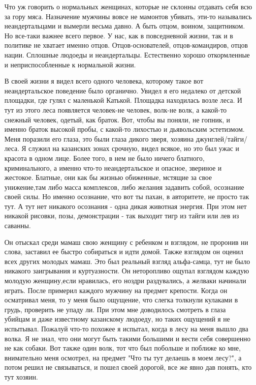 Что уж говорить о нормальных женщинах, которые не склонны отдавать себя всю за
гору мяса. Назначение мужчины вовсе не мамонтов убивать, эти-то назывались
неандертальцами и вымерли весьма давно. А быть отцом, воином, защитником. Но
все-таки важнее всего первое. У нас, как в повседневной жизни, так и в политике
не хватает именно отцов. Отцов-основателей, отцов-командиров, отцов нации.
Сплошные людоеды и неандертальцы. Естественно хорошо откормленные и
неприспособленные к нормальной жизни. 

В своей жизни я видел всего одного человека, которому такое вот неандертальское
поведение было органично. Увидел я его недалеко от детской площадки, где гулял
с маленькой Катькой. Площадка находилась возле леса. И тут из этого леса
появляется человек-не человек, волк-не волк, а какой-то снежный человек,
одетый, как браток. Вот, чтобы вы поняли, не гопник, и именно браток высокой
пробы, с какой-то лихостью и дьявольским эстетизмом. Меня поразили его глаза,
это были глаза дикого зверя, хозяина джунглей/тайги/леса. Я служил на казанских
зонах срочную, видел всякое, но это был ужас и красота в одном лице. Более
того, в нем не было ничего блатного, криминального, а именно что-то
неандертальское и опасное, звериное и жестокое. Блатные, они как бы жизнью
обиженные, мстящие за свое унижение,там либо масса комплексов, либо желания
задавить собой, осознание своей силы. Но именно осознание, что вот ты пахан, в
авторитете, не просто так тут. А тут нет никакого осознания - одна дикая
животная энергия. При этом нет никакой рисовки, позы, демонстрации - так
выходит тигр из тайги или лев из саванны. 

Он отыскал среди мамаш свою женщину с ребенком и взглядом, не проронив ни
слова, заставил ее быстро собираться и идти домой. Также взглядом он оценил
всех других молодых мамаш. Это был реальный взгляд альфа-самца, тут не было
никакого заигрывания и куртуазности. Он неторопливо ощупал взглядом каждую
молодую женщину,если нравилась, его ноздри раздувались, а желваки начинали
играть. После примерил каждого мужчину на предмет крепости. Когда он осматривал
меня, то у меня было ощущение, что слегка толкнули кулаками в грудь, проверить
не упаду ли. При этом мне доводилось смотреть в глаза убийцам и даже известному
казанскому людоеду, но таких ощущений я не испытывал. Пожалуй что-то похожее я
испытал, когда в лесу на меня вышло два волка. Я не знал, что они могут быть
такими большими и вести себя совершенно не как собаки. Вот также один волк, тот
что был побольше и поближе ко мне, внимательно меня осмотрел, на предмет "Что
ты тут делаешь в моем лесу?", а потом решил не связываться, и пошел своей
дорогой, все же явно дав понять, кто тут хозяин. 

